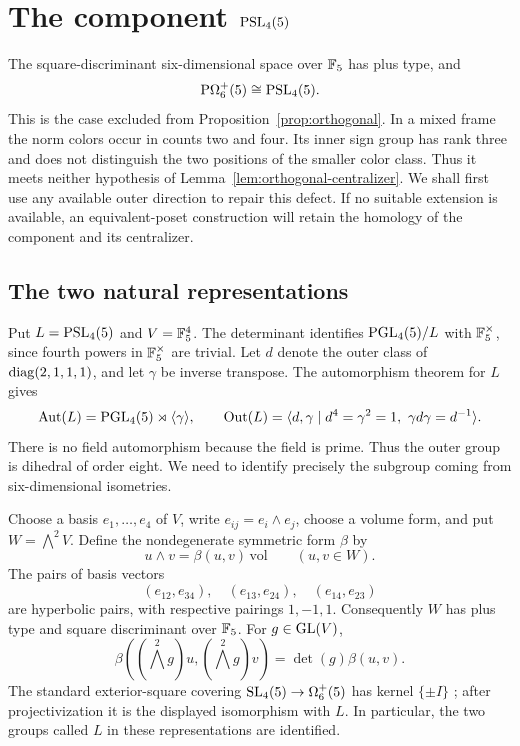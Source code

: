 \section{The component \texorpdfstring{$\operatorname{PSL}_4(5)$}{PSL4(5)}}\label{sec:exceptional}

The square-discriminant six-dimensional space over $\mathbb F_5$ has plus
type, and
\[
 \mathrm P\Omega_6^+(5)\cong\operatorname{PSL}_4(5).
\]
This is the case excluded from Proposition~\ref{prop:orthogonal}.
In a mixed frame the norm colors occur in counts two and four.
Its inner sign group has rank three and does not distinguish the two
positions of the smaller color class. Thus it meets neither hypothesis
of Lemma~\ref{lem:orthogonal-centralizer}.
We shall first use any available outer direction to repair this
defect. If no suitable extension is available, an equivalent-poset
construction will retain the homology of the component and its
centralizer.

\subsection{The two natural representations}

Put $L=\operatorname{PSL}_4(5)$ and $V=\mathbb F_5^4$. The determinant identifies
$\operatorname{PGL}_4(5)/L$ with $\mathbb F_5^\times$, since fourth powers in $\mathbb F_5^\times$
are trivial. Let $d$ denote the outer class of
$\operatorname{diag}(2,1,1,1)$, and let $\gamma$ be inverse transpose. The
automorphism theorem for $L$
\citep[Section~2 and statements~3.2--3.6]{Steinberg1960} gives
\begin{equation}\label{eq:psl45-outer}
 \operatorname{Aut}(L)=\operatorname{PGL}_4(5)\rtimes\langle\gamma\rangle,\qquad
 \operatorname{Out}(L)=\langle d,\gamma\mid
 d^4=\gamma^2=1,\ \gamma d\gamma=d^{-1}\rangle.
\end{equation}
There is no field automorphism because the field is prime. Thus the
outer group is dihedral of order eight. We need to identify precisely
the subgroup coming from six-dimensional isometries.

Choose a basis $e_1,\ldots,e_4$ of $V$, write
$e_{ij}=e_i\wedge e_j$, choose a volume form, and put
$W=\bigwedge^2V$. Define the
nondegenerate symmetric form $\beta$ by
\[
 u\wedge v=\beta(u,v)\,\mathrm{vol}\qquad(u,v\in W).
\]
The pairs of basis vectors
\[
 (e_{12},e_{34}),\quad(e_{13},e_{24}),\quad(e_{14},e_{23})
\]
are hyperbolic pairs, with respective pairings $1,-1,1$.
Consequently $W$ has plus type and square discriminant over $\mathbb F_5$.
For $g\in\operatorname{GL}(V)$,
\begin{equation}\label{eq:psl45-wedge-multiplier}
 \beta((\bigwedge^2g)u,(\bigwedge^2g)v)=\det(g)\beta(u,v).
\end{equation}
The standard exterior-square covering
$\operatorname{SL}_4(5)\to\Omega_6^+(5)$ has kernel $\{\pm I\}$
\citep[Theorem~12.20 and Corollary~12.21]{Taylor1992}; after
projectivization it is the displayed isomorphism with $L$.
In particular, the two groups called $L$ in these representations
are identified.

